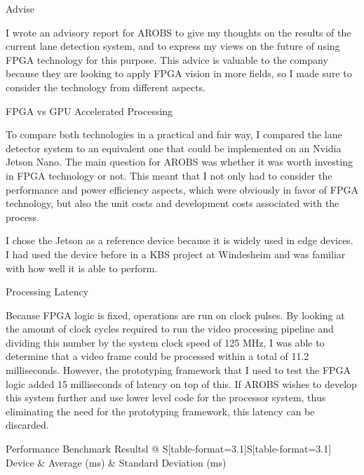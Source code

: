\documentclass{matthijs}
\begin{document}
	\begin{hoofdstuk}{Advise}

		\setlength\parindent{1.5em}
		\setlength{\parskip}{0.5em plus 0.2em minus 0.1em}
		\linespread{1.2}
		\vspace{-1ex}
		
		I wrote an advisory report for AROBS to give my thoughts on the results of the current lane detection system, and to express my views on the future of using FPGA technology for this purpose.
		This advice is valuable to the company because they are looking to apply FPGA vision in more fields, so I made sure to consider the technology from different aspects.

		\begin{paragraaf}{FPGA vs GPU Accelerated Processing}

			To compare both technologies in a practical and fair way, I compared the lane detector system to an equivalent one that could be implemented on an Nvidia Jetson Nano.
			The main question for AROBS was whether it was worth investing in FPGA technology or not.
			This meant that I not only had to consider the performance and power efficiency aspects, which were obviously in favor of FPGA technology, but also the unit costs and development costs associated with the process.

			\noindent I chose the Jetson as a reference device because it is widely used in edge devices.
			I had used the device before in a KBS project at Windesheim and was familiar with how well it is able to perform.

			\begin{subparagraaf}{Processing Latency}

				Because FPGA logic is fixed, operations are run on clock pulses.
				By looking at the amount of clock cycles required to run the video processing pipeline and dividing this number by the system clock speed of 125 MHz, I was able to determine that a video frame could be processed within a total of 11.2 milliseconds.
				However, the prototyping framework that I used to test the FPGA logic added 15 milliseconds of latency on top of this.
				If AROBS wishes to develop this system further and use lower level code for the processor system, thus eliminating the need for the prototyping framework, this latency can be discarded.

				\vspace{1.5ex}
				\begin{tabel}{Performance Benchmark Results}{l @{\extracolsep{\fill}} S[table-format=3.1]S[table-format=3.1]}
					Device & {Average (ms)} & {Standard Deviation (ms)} \tabularnewline
					\midrule


\end{tabel}
\end{subparagraaf}
\end{paragraaf}
\end{hoofdstuk}
\end{document}
